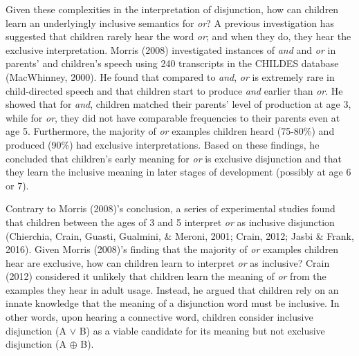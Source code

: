 \documentclass[10pt, letterpaper]{article}
\begin{document}
Given these complexities in the interpretation of disjunction, how can
children learn an underlyingly inclusive semantics for \emph{or}? A
previous investigation has suggested that children rarely hear the word
\emph{or}; and when they do, they hear the exclusive interpretation.
Morris (2008) investigated instances of \emph{and} and \emph{or} in
parents' and children's speech using 240 transcripts in the CHILDES
database (MacWhinney, 2000). He found that compared to \emph{and},
\emph{or} is extremely rare in child-directed speech and that children
start to produce \emph{and} earlier than \emph{or}. He showed that for
\emph{and}, children matched their parents' level of production at age
3, while for \emph{or}, they did not have comparable frequencies to
their parents even at age 5. Furthermore, the majority of \emph{or}
examples children heard (75-80\%) and produced (90\%) had exclusive
interpretations. Based on these findings, he concluded that children's
early meaning for \emph{or} is exclusive disjunction and that they learn
the inclusive meaning in later stages of development (possibly at age 6
or 7).

Contrary to Morris (2008)'s conclusion, a series of experimental studies
found that children between the ages of 3 and 5 interpret \emph{or} as
inclusive disjunction (Chierchia, Crain, Guasti, Gualmini, \& Meroni,
2001; Crain, 2012; Jasbi \& Frank, 2016). Given Morris (2008)'s finding
that the majority of \emph{or} examples children hear are exclusive, how
can children learn to interpret \emph{or} as inclusive? Crain (2012)
considered it unlikely that children learn the meaning of \emph{or} from
the examples they hear in adult usage. Instead, he argued that children
rely on an innate knowledge that the meaning of a disjunction word must
be inclusive. In other words, upon hearing a connective word, children
consider inclusive disjunction (A \(\vee\) B) as a viable candidate for
its meaning but not exclusive disjunction (A \(\oplus\) B).
\end{document}
